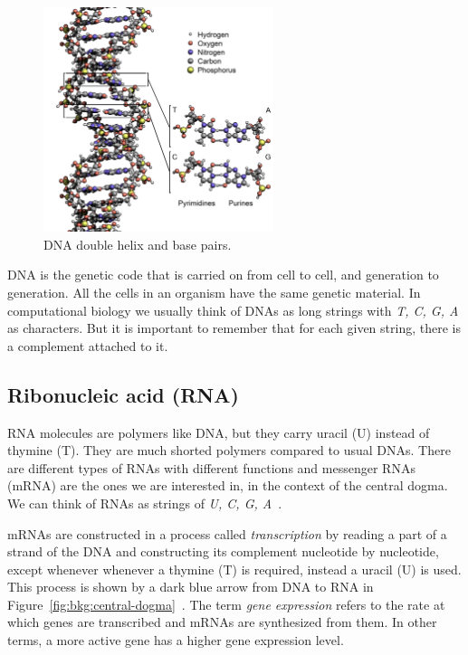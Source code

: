 \begin{figure}[!ht]
  \centering
  \includegraphics[width=0.6\textwidth]{figs/background/simplified_DNA_Structure_Key_Labelled_pn_NoBB}
  \caption{DNA double helix and base pairs\protect\footnotemark.}
  \label{fig:bkg:dna-basic}
\end{figure}

DNA is the genetic code that is carried on from cell to cell, and generation to generation. All the cells in an organism have the same genetic material. In computational biology we usually think of DNAs as long strings with \emph{T, C, G, A} as characters. But it is important to remember that for each given string, there is a complement attached to it.

\subsection{Ribonucleic acid (RNA)}
RNA molecules are polymers like DNA, but they carry uracil (U) instead of thymine (T). They are much shorted polymers compared to usual DNAs. There are different types of RNAs with different functions and messenger RNAs (mRNA) are the ones we are interested in, in the context of the central dogma. We can think of RNAs as strings of \emph{U, C, G, A}~\cite[Ch. 6]{the-cell}.

mRNAs are constructed in a process called \emph{transcription} by reading a part of a strand of the DNA and constructing its complement nucleotide by nucleotide, except whenever whenever a thymine (T) is required, instead a uracil (U) is used. This process is shown by a dark blue arrow from DNA to RNA in Figure~\ref{fig:bkg:central-dogma}~\cite[Ch. 6]{the-cell}. The term \emph{gene expression} refers to the rate at which genes are transcribed and mRNAs are synthesized from them. In other terms, a more active gene has a higher gene expression level.


